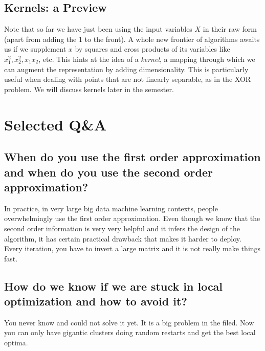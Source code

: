 \documentclass[a4paper]{article}
\begin{document}
\subsection{Kernels: a Preview}
Note that so far we have just been using the input variables $X$ in their raw form (apart from adding the 1 to the front). A whole new frontier of algorithms awaits us if we supplement $x$ by squares and cross products of its variables like $x_1^2,x_2^2, x_1x_2$, etc. This hints at the idea of a \textit{kernel}, a mapping through which we can augment the representation by adding dimensionality. This is particularly useful when dealing with points that are not linearly separable, as in the XOR problem. We will discuss kernels later in the semester.


\section{Selected Q\&A}
\subsection{When do you use the first order approximation and when do you use the second order approximation?}
In practice, in very large big data machine learning contexts, people overwhelmingly use the first order approximation. Even though we know that the second order information is very very helpful and it infers the design of the algorithm, it has certain practical drawback that makes it harder to deploy. Every  iteration, you have to invert a large matrix and it is not really make things fast. 

\subsection{How do we know if we are stuck in local optimization and how to avoid it?}
You never know and could not solve it yet. It is a big problem in the filed. Now you can only have gigantic clusters doing random restarts and get the best local optima.  
\end{document}
